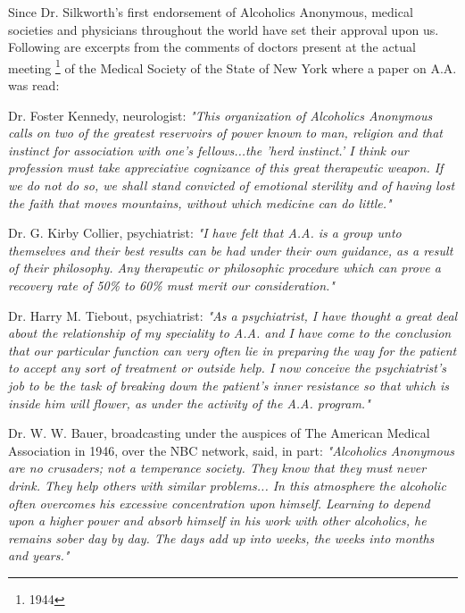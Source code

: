 


\begin{biblechapter}
    Since Dr. Silkworth's first endorsement of Alcoholics Anonymous, 
    medical societies and physicians throughout the world 
    have set their approval upon us.
\verse Following are excerpts from the comments of doctors 
    present at the actual meeting
    \footnote[*]{1944}
    of the Medical Society 
    of the State of New York where a paper on A.A. was read:

    Dr. Foster Kennedy, neurologist: 
    \emph{"This organization of Alcoholics Anonymous 
    calls on two of the greatest reservoirs of power known to man, 
    religion and that instinct for association with one's fellows...the 
    'herd instinct.'
\verse I think our profession must take appreciative cognizance
    of this great therapeutic weapon.
\verse If we do not do so, 
    we shall stand convicted of emotional sterility 
    and of having lost the faith that moves mountains, 
    without which medicine can do little."
}

    Dr. G. Kirby Collier, psychiatrist: 
    \emph{"I have felt that A.A. is a group unto themselves 
        and their best results can be had under their own guidance, 
        as a result of their philosophy.
\verse Any therapeutic or philosophic procedure which can prove a recovery rate of 50\% to 60\% must merit our consideration."
}

    Dr. Harry M. Tiebout, psychiatrist: 
    \emph{"As a psychiatrist, 
    I have thought a great deal about the relationship 
    of my speciality to A.A. 
    and I have come to the conclusion that our particular function 
    can very often lie in preparing the way for the patient 
    to accept any sort of treatment or outside help.
\verse I now conceive the psychiatrist's job to be the task of 
    breaking down the patient's inner resistance 
    so that which is inside him will flower, 
    as under the activity of the A.A. program."
}
\end{biblechapter}
 
\begin{biblechapter}
    Dr. W. W. Bauer, 
    broadcasting under the auspices of The American Medical Association 
    in 1946, over the NBC network, said, in part: 
\verse\emph{ "Alcoholics Anonymous are no crusaders; 
    not a temperance society.  
\verse They know that they must never drink.
\verse They help others with similar problems... 
\verse In this atmosphere the alcoholic often overcomes 
    his excessive concentration upon himself.
\verse Learning to depend upon a higher power 
    and absorb himself in his work with other alcoholics, 
    he remains sober day by day.
\verse The days add up into weeks, the weeks into months and years."
}
\end{biblechapter}
 
